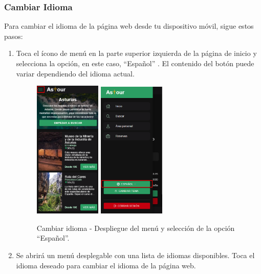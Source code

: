 \subsubsection{Cambiar Idioma}
Para cambiar el idioma de la página web desde tu dispositivo móvil, sigue estos pasos:
\begin{enumerate}
	\item Toca el ícono de menú en la parte superior izquierda de la página de inicio y selecciona la opción, en este caso, “Español” . El contenido del botón puede variar dependiendo del idioma actual.
	      \begin{figure}[H]
		      \centering
		      \includegraphics[width=0.3\textwidth]{7-Construccion/Manuales/mobile/menu marcado.png}
		      \includegraphics[width=0.3\textwidth]{7-Construccion/Manuales/mobile/idioma marcado.png}
		      \caption{Cambiar idioma - Despliegue del menú y selección de la opción “Español”.}
	      \end{figure}
	\item Se abrirá un menú desplegable con una lista de idiomas disponibles. Toca el idioma deseado para cambiar el idioma de la página web.

\end{enumerate}
